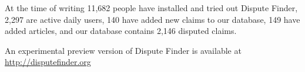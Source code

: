 \documentclass{www2010-submission}
\newcommand{\todo}[1]{}
\begin{document}
At the time of writing 11,682 people have installed and tried out Dispute Finder, 2,297 are active daily users, 140 have added new claims to our database, 149 have added articles, and our database contains 2,146 disputed claims. 

An experimental preview version of Dispute Finder is available at 
\url{http://disputefinder.org}


\todo{Add count of disputed claims}


\todo{Do we want to have acknowledgements}


\todo{Sort out bad references}

\end{document}
